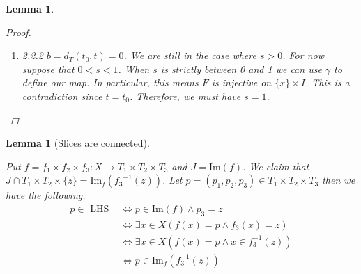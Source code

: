 \documentclass{article}
\theoremstyle{mystyle}
\newtheorem{lem}[thm]{Lemma}
\theoremstyle{remark}
\newtheorem{rmk}{Remark}[section]
\begin{document}
\begin{lem}
\begin{proof}
\begin{enumerate}
\begin{enumerate}
\begin{enumerate}
                        \item 2.2.2 $b=d_T(t_0,t) = 0$. We are still in the case where $s > 0$. For now suppose that $0 < s < 1$. When $s$ is strictly between 0 and 1 we can use $\gamma$ to define our map. In particular, this means $F$ is injective on $\{x\}\times I$. This is a contradiction since $t=t_0$. Therefore, we must have $s = 1$.
                    \end{enumerate}
                \end{enumerate}
            \end{enumerate}
    
    \end{proof}
\end{lem}
\begin{lem}
    [Slices are connected]
 \label{lem:fibershomeoplanes} 


    Put \(f =  f_{1} \times f_{2} \times f_{3}: X \to T_{1} \times T_{2} \times T_{3} \) and \(J = \text{Im}(f)\). We claim that \(J \cap T_{1} \times T_{2} \times \{z\} = \text{Im}_{f} ({ f_{3}}^{-1}(z))\). Let \(p = (p_{1}, p_{2} , p_{3}) \in T_{1} \times T_{2} \times T_{3}\) then we have the following. 
    \begin{align*}
        p \in \text { LHS } & \Longleftrightarrow p \in \text{Im}(f) \wedge p_{3} = z \\ 
        & \Longleftrightarrow \exists x \in X (f(x)=p \wedge  f_3(x)=z)\\
        & \Longleftrightarrow \exists x \in X (f(x)=p \wedge x \in f_3^{-1} (z))\\
        & \Longleftrightarrow p \in \text{Im}_f(f_3^{-1} (z))
    \end{align*}
\end{lem}
\end{document}
